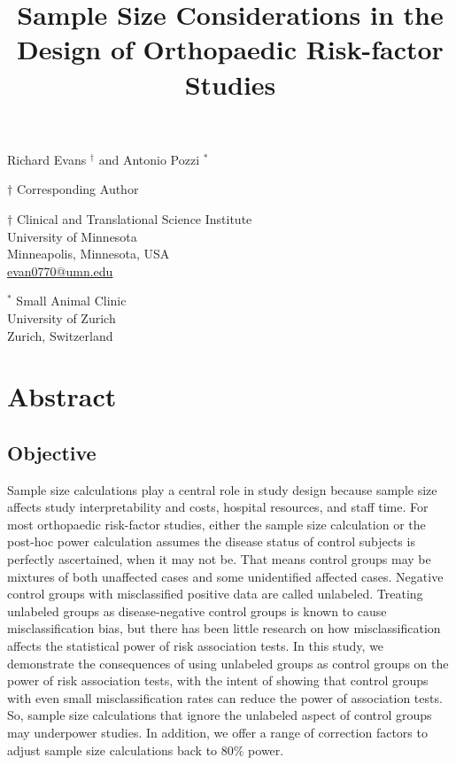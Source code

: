 \documentclass[
]{article}
\title{\textbf{Sample Size Considerations in the Design of Orthopaedic
Risk-factor Studies}}
\author{}
\date{\vspace{-2.5em}}
\begin{document}
\maketitle

Richard Evans \({^\dagger}\) and Antonio Pozzi \({^*}\)

\({\dagger}\) Corresponding Author

\({\dagger}\) Clinical and Translational Science Institute\\
University of Minnesota\\
Minneapolis, Minnesota, USA\\
\href{mailto:evan0770@umn.edu}{evan0770@umn.edu}

\({^*}\) Small Animal Clinic\\
University of Zurich\\
Zurich, Switzerland

\hypertarget{abstract}{%
\section{Abstract}\label{abstract}}

\hypertarget{objective}{%
\subsection{Objective}\label{objective}}

Sample size calculations play a central role in study design because
sample size affects study interpretability and costs, hospital
resources, and staff time. For most orthopaedic risk-factor studies,
either the sample size calculation or the post-hoc power calculation
assumes the disease status of control subjects is perfectly ascertained,
when it may not be. That means control groups may be mixtures of both
unaffected cases and some unidentified affected cases. Negative control
groups with misclassified positive data are called unlabeled. Treating
unlabeled groups as disease-negative control groups is known to cause
misclassification bias, but there has been little research on how
misclassification affects the statistical power of risk association
tests. In this study, we demonstrate the consequences of using unlabeled
groups as control groups on the power of risk association tests, with
the intent of showing that control groups with even small
misclassification rates can reduce the power of association tests. So,
sample size calculations that ignore the unlabeled aspect of control
groups may underpower studies. In addition, we offer a range of
correction factors to adjust sample size calculations back to 80\%
power.
\end{document}
